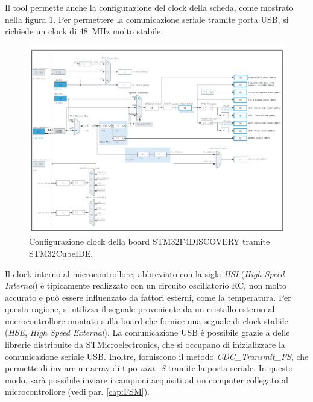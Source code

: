 Il tool permette anche la configurazione del clock della scheda, come mostrato nella figura \ref{fig:Clock}. Per permettere la comunicazione seriale tramite porta USB, si richiede un clock di \SI{48}{\mega\hertz} molto stabile. 
 \begin{figure}[tbh]
 	\centering
 	\includegraphics[width=1.4\linewidth, angle =90]{ImageFiles/Firmware/Clock}
 	\caption{Configurazione clock della board STM32F4DISCOVERY tramite STM32CubeIDE.}
 	\label{fig:Clock}
 \end{figure}
Il clock interno al microcontrollore, abbreviato con la sigla \textit{HSI} (\textit{High Speed Internal}) è tipicamente realizzato con un circuito oscillatorio RC, non molto accurato e può essere influenzato da fattori esterni, come la temperatura. Per questa ragione, si utilizza il segnale proveniente da un cristallo esterno al microcontrollore montato sulla board che fornice una segnale di clock stabile (\textit{HSE}, \textit{High Speed External}). La comunicazione USB è possibile grazie a delle librerie distribuite da STMicroelectronics, che si occupano di inizializzare la comunicazione seriale USB. Inoltre, forniscono il metodo \textit{CDC\_Transmit\_FS}, che permette di inviare un array di tipo \textit{uint\_8} tramite la porta seriale. In questo modo, sarà possibile inviare i campioni acquisiti ad un computer collegato al microcontrollore (vedi par. \ref{cap:FSM}).

\clearpage